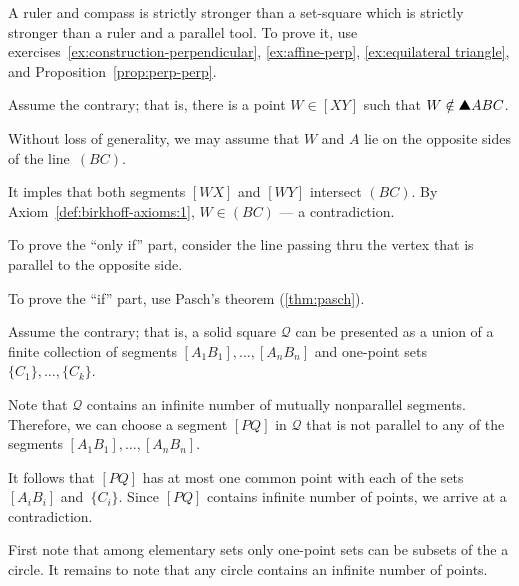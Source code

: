 A ruler and compass is strictly stronger than a set-square which is strictly stronger than a ruler and a parallel tool.
To prove it, use exercises~\ref{ex:construction-perpendicular},
\ref{ex:affine-perp},
\ref{ex:equilateral triangle},
and Proposition~\ref{prop:perp-perp}.

\setcounter{eqtn}{0} 

Assume the contrary; 
that is, there is a point $W\in [XY]$ such that $W\notin\solidtriangle ABC$.



Without loss of generality, we may assume that $W$ and $A$ lie on the opposite sides of the line~$(BC)$.

It imples that both segments $[WX]$ and $[WY]$ intersect $(BC)$.
By Axiom~\ref{def:birkhoff-axioms:1}, $W\in (BC)$ --- a contradiction.


To prove the ``only if'' part, consider the line passing thru the vertex that is parallel to the opposite side.

To prove the ``if'' part, use Pasch's theorem (\ref{thm:pasch}).

Assume the contrary; that is, a solid square $\mathcal{Q}$ can be presented as a union of a finite collection of segments $[A_1B_1],\dots,[A_nB_n]$
and one-point sets $\{C_1\},\dots,\{C_k\}$.

Note that $\mathcal{Q}$ contains an infinite number of mutually nonparallel segments.
Therefore, we can choose a segment $[PQ]$ in $\mathcal{Q}$ 
that is not parallel to any of the segments $[A_1B_1],\dots,[A_nB_n]$.

It follows that $[PQ]$ has at most one common point with each of the sets $[A_iB_i]$ and~$\{C_i\}$.
Since $[PQ]$ contains infinite number of points, we arrive at a contradiction.

First note that among elementary sets
only one-point sets can be subsets of the a circle.
It remains to note that any circle contains an infinite number of points.




